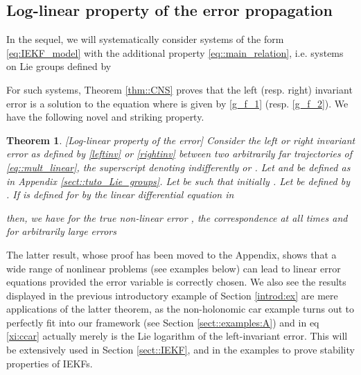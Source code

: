 \documentclass[a4paper,12pt,onecolumn]{article}
\newtheorem{thm}{Theorem}
\begin{document}
\subsection{Log-linear property of the error propagation}
In the sequel, we will systematically consider systems of the form \eqref{eq:IEKF_model} with the additional property  \eqref{eq::main_relation}, i.e.  systems on Lie groups defined by






For such systems, Theorem \ref{thm::CNS} proves that the left (resp. right) invariant error  is a solution to the equation   where  is given by   \eqref{g_f_1} (resp. \eqref{g_f_2}).  We have the following novel and striking property. 





\begin{thm}\label{dechire:thm}[Log-linear property of the error]
Consider the left or right invariant error  as defined by \eqref{leftinv} or \eqref{rightinv} between two arbitrarily far  trajectories of \eqref{eq::mult_linear}, the superscript   denoting indifferently  or . Let  and  be defined as in Appendix \ref{sect::tuto_Lie_groups}. Let  be such that initially . Let  be  defined by . If  is defined for  by the \emph{linear} differential equation in  

\emph{then}, we have for the true non-linear error , the correspondence \emph{at all times} and for arbitrarily large errors 

 \end{thm}The latter result, whose proof has been moved to the Appendix, shows that a wide range of nonlinear problems (see examples below) can lead to linear error equations provided the error variable is correctly chosen.  We also see the results displayed in the previous introductory example of Section \ref{introd:ex} are mere applications of the latter theorem, as the non-holonomic car example turns out to perfectly fit into our framework (see Section \ref{sect::examples:A}) and   in eq \eqref{xi:ccar} actually  merely is the Lie logarithm of the left-invariant error.   
 This will be extensively used in Section \ref{sect::IEKF}, and in the examples to prove stability properties of IEKFs.
\end{document}
